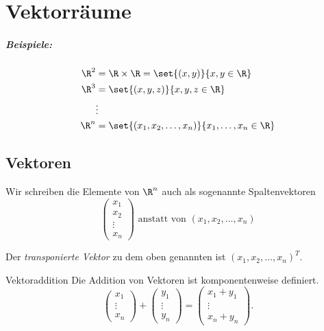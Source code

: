 \chapter{Vektorräume}
\paragraph{Beispiele:}
\begin{align*}
  \R^2&=\R\times\R=\set{(x,y)}{x,y\in\R}\\
  \R^3&=\set{(x,y,z)}{x,y,z\in\R}\\
  &\vdots\\
  \R^n&=\set{(x_1,x_2,\ldots,x_n)}{x_1,\ldots,x_n\in\R}\\
\end{align*}
\section{Vektoren}
Wir schreiben die Elemente von $\R^n$ auch als sogenannte Spaltenvektoren
\begin{equation*}
  \begin{pmatrix}
    x_1\\
    x_2\\
    \vdots\\
    x_n
  \end{pmatrix} \text{ anstatt von } (x_1,x_2,\ldots,x_n)
\end{equation*}

Der \emph{transponierte Vektor} zu dem oben genannten ist $(x_1,x_2,\ldots,x_n)^T$.

\begin{definition}{Vektoraddition}
  Die Addition von Vektoren ist komponentenweise definiert.
  \begin{equation*}
  \begin{pmatrix}
    x_1\\
    \vdots\\
    x_n
  \end{pmatrix}
  +
  \begin{pmatrix}
    y_1\\
    \vdots\\
    y_n
  \end{pmatrix}
  =
  \begin{pmatrix}
    x_1+y_1\\
    \vdots\\
    x_n+y_n
  \end{pmatrix}.
\end{equation*}
\end{definition}

